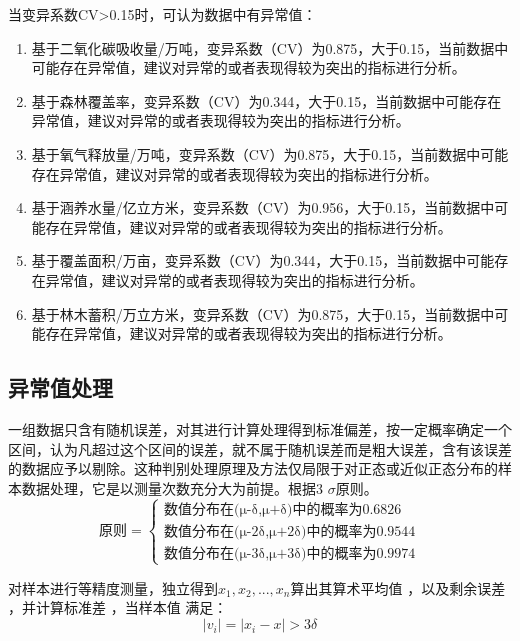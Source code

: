 \documentclass[UTF8]{ctexart}
\begin{document}
当变异系数CV>0.15时，可认为数据中有异常值：

\begin{enumerate}
\item 基于二氧化碳吸收量/万吨，变异系数（CV）为0.875，大于0.15，当前数据中可能存在异常值，建议对异常的或者表现得较为突出的指标进行分析。
\item 基于森林覆盖率，变异系数（CV）为0.344，大于0.15，当前数据中可能存在异常值，建议对异常的或者表现得较为突出的指标进行分析。
\item 基于氧气释放量/万吨，变异系数（CV）为0.875，大于0.15，当前数据中可能存在异常值，建议对异常的或者表现得较为突出的指标进行分析。
\item 基于涵养水量/亿立方米，变异系数（CV）为0.956，大于0.15，当前数据中可能存在异常值，建议对异常的或者表现得较为突出的指标进行分析。
\item 基于覆盖面积/万亩，变异系数（CV）为0.344，大于0.15，当前数据中可能存在异常值，建议对异常的或者表现得较为突出的指标进行分析。
\item 基于林木蓄积/万立方米，变异系数（CV）为0.875，大于0.15，当前数据中可能存在异常值，建议对异常的或者表现得较为突出的指标进行分析。
\end{enumerate}

\subsection{异常值处理}
一组数据只含有随机误差，对其进行计算处理得到标准偏差，按一定概率确定一个区间，认为凡超过这个区间的误差，就不属于随机误差而是粗大误差，含有该误差的数据应予以剔除。这种判别处理原理及方法仅局限于对正态或近似正态分布的样本数据处理，它是以测量次数充分大为前提。根据3 $\sigma$原则。
\begin{equation}
    \text{原则}=\left \{
         \begin{aligned}
            \text{数值分布在(μ-δ,μ+δ)中的概率为0.6826}\\
            \text{数值分布在(μ-2δ,μ+2δ)中的概率为0.9544}\\
            \text{数值分布在(μ-3δ,μ+3δ)中的概率为0.9974}
         \end{aligned}
     \right.
\end{equation}

对样本进行等精度测量，独立得到$x_1,x_2,...,x_n$算出其算术平均值 ，以及剩余误差 ，并计算标准差 ，当样本值 满足：
\begin{equation}
    \left|v_i\right|=\left|x_i-x\right|>3\delta
\end{equation}
\end{document}
